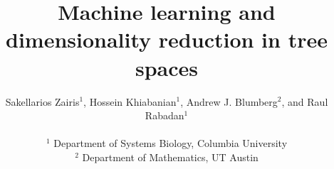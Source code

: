 \documentclass[a4paper,11pt]{article}
\begin{document}
\title{Machine learning and dimensionality reduction in tree spaces}

\author{Sakellarios Zairis$^1$, Hossein Khiabanian$^1$, Andrew J. Blumberg$^2$, and Raul Rabadan$^1$\\
\\
$^1$ Department of Systems Biology, Columbia University\\
$^2$ Department of Mathematics, UT Austin\\}
\maketitle


\end{document}
